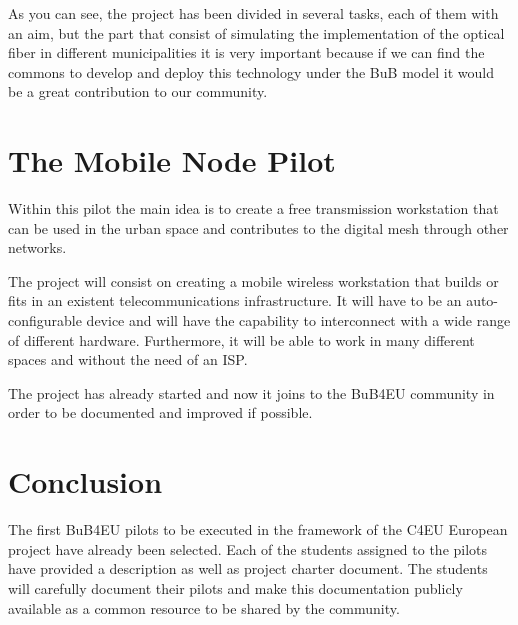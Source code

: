\documentclass[draftclsnofoot,12pt,journal,onecolumn]{IEEEtran}
\begin{document}
As you can see, the project has been divided in several tasks, each of them with an aim, but the part that consist of simulating the implementation of the optical fiber in different municipalities it is very important because if we can find the commons to develop and deploy this technology under the BuB model it would be a great contribution to our community.

\section{The Mobile Node Pilot}
\label{sec:mon}

Within this pilot the main idea is to create a free transmission workstation that can be used in the urban space and contributes to the digital mesh through other networks.

The project will consist on creating a mobile wireless workstation that builds or fits in an existent telecommunications 								infrastructure. It will have to be an auto-configurable device and will have the capability to interconnect with a wide range of 					different hardware. Furthermore, it will be able to work in many different spaces and without the need of an ISP.

The project has already started and now it joins to the BuB4EU community in order to be documented and improved if possible.  

\section{Conclusion}
\label{sec:conclusion}

The first BuB4EU pilots to be executed in the framework of the C4EU European project have already been selected.
Each of the students assigned to the pilots have provided a description as well as project charter document.
The students will carefully document their pilots and make this documentation publicly available as a common resource to be shared by the community.




\end{document}

